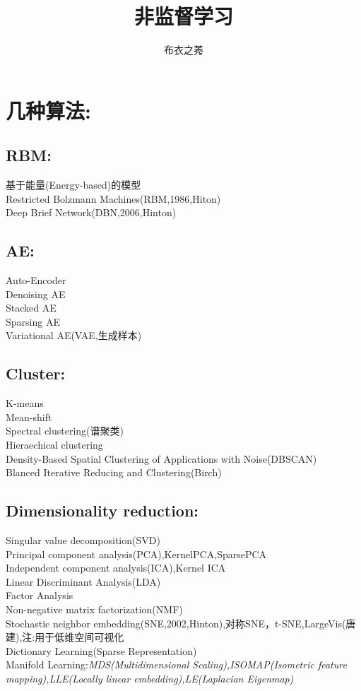 \documentclass{article}
\title{非监督学习}
\author{布衣之莠}
\begin{document}
\maketitle
\section{几种算法:}
\subsection{RBM:}
基于能量(Energy-based)的模型\\
Restricted Bolzmann Machines(RBM,1986,Hiton)\\
Deep Brief Network(DBN,2006,Hinton)
\subsection{AE:}
Auto-Encoder\\
Denoising AE\\
Stacked AE\\
Sparsing AE\\
Variational AE(VAE,生成样本)
\subsection{Cluster:}
K-means\\
Mean-shift\\
Spectral clustering(谱聚类)\\
Hieraechical clustering\\
Density-Based Spatial Clustering of Applications with Noise(DBSCAN)\\
Blanced Iterative Reducing and Clustering(Birch)\\
\subsection{Dimensionality reduction:}
Singular value decomposition(SVD)\\
Principal component analysis(PCA),KernelPCA,SparsePCA\\
Independent component analysis(ICA),Kernel ICA\\
Linear Discriminant Analysis(LDA)\\
Factor Analysis\\
Non-negative matrix factorization(NMF)\\
Stochastic neighbor embedding(SNE,2002,Hinton),对称SNE，t-SNE,LargeVis(唐建),注:用于低维空间可视化\\
Dictionary Learning(Sparse Representation)\\
Manifold Learning:\textit{MDS(Multidimensional Scaling),ISOMAP(Isometric feature mapping),LLE(Locally linear embedding),LE(Laplacian Eigenmap)}
\end{document}

